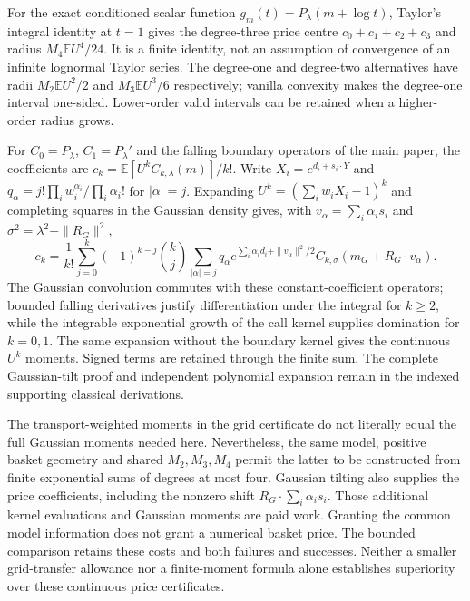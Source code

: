 For the exact conditioned scalar function $g_m(t)=P_\lambda(m+\log t)$,
Taylor's integral identity at $t=1$ gives the degree-three price centre
$c_0+c_1+c_2+c_3$ and radius $M_4\mathbb E U^4/24$.
It is a finite identity, not an assumption of convergence of an infinite
lognormal Taylor series. The degree-one and degree-two alternatives have
radii $M_2\mathbb E U^2/2$ and $M_3\mathbb E U^3/6$ respectively;
vanilla convexity makes the degree-one interval one-sided. Lower-order
valid intervals can be retained when a higher-order radius grows.

For $C_0=P_\lambda$, $C_1=P_\lambda'$ and the falling boundary
operators of the main paper, the coefficients are
$ c_k=\mathbb E[U^kC_{k,\lambda}(m)]/k!$.
Write $X_i=e^{d_i+s_i\cdot Y}$ and
$q_\alpha=j!\prod_iw_i^{\alpha_i}/\prod_i\alpha_i!$ for
$|\alpha|=j$. Expanding $U^k=(\sum_iw_iX_i-1)^k$ and completing
squares in the Gaussian density gives, with
$v_\alpha=\sum_i\alpha_i s_i$ and
$\sigma^2=\lambda^2+\|R_G\|^2$,
\[
 c_k=\frac1{k!}\sum_{j=0}^k(-1)^{k-j}{k\choose j}
 \sum_{|\alpha|=j}q_\alpha
 e^{\sum_i\alpha_id_i+\|v_\alpha\|^2/2}
 C_{k,\sigma}(m_G+R_G\cdot v_\alpha).
\]
The Gaussian convolution commutes with these constant-coefficient
operators; bounded falling derivatives justify differentiation under the
integral for $k\geq2$, while the integrable exponential growth of the
call kernel supplies domination for $k=0,1$. The same expansion without
the boundary kernel gives the continuous $U^k$ moments. Signed terms
are retained through the finite sum. The complete Gaussian-tilt proof
and independent polynomial expansion remain in the indexed supporting
classical derivations.

The transport-weighted moments in the grid certificate do not literally
equal the full Gaussian moments needed here. Nevertheless, the same model,
positive basket geometry and shared $M_2,M_3,M_4$ permit the latter to be
constructed from finite exponential sums of degrees at most four.
Gaussian tilting also supplies the price coefficients, including the
nonzero shift $R_G\cdot\sum_i\alpha_i s_i$. Those additional kernel
evaluations and Gaussian moments are paid work. Granting the common model
information does not grant a numerical basket price. The bounded
comparison retains these costs and both failures and successes.
Neither a smaller grid-transfer allowance nor a finite-moment formula
alone establishes superiority over these continuous price certificates.
